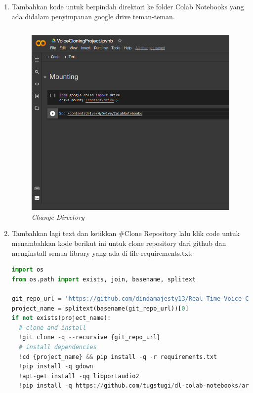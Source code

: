 \begin{enumerate}
\item Tambahkan kode untuk berpindah direktori ke folder Colab Notebooks yang ada didalam penyimpanan google drive teman-teman.
\begin{lstlisting}[language=Python, caption=Change Directory]
%cd /content/drive/MyDrive/ColabNotebooks
\end{lstlisting}
\begin{figure}[H]
    \centering
    \includegraphics[scale=0.3]{figures/colab6}
    \caption{\textit{Change Directory}}
    \label{colab6}
\end{figure}

\item Tambahkan lagi text dan ketikkan \#Clone Repository lalu klik code untuk menambahkan kode berikut ini untuk clone repository dari github dan menginstall semua library yang ada di file requirements.txt.

\begin{lstlisting}[language=Python, caption=Clone Repository]
%tensorflow_version 1.x
import os
from os.path import exists, join, basename, splitext

git_repo_url = 'https://github.com/dindamajesty13/Real-Time-Voice-Cloning.git'
project_name = splitext(basename(git_repo_url))[0]
if not exists(project_name):
  # clone and install
  !git clone -q --recursive {git_repo_url}
  # install dependencies
  !cd {project_name} && pip install -q -r requirements.txt
  !pip install -q gdown
  !apt-get install -qq libportaudio2
  !pip install -q https://github.com/tugstugi/dl-colab-notebooks/archive/colab_utils.zip
\end{lstlisting}


\end{enumerate}
